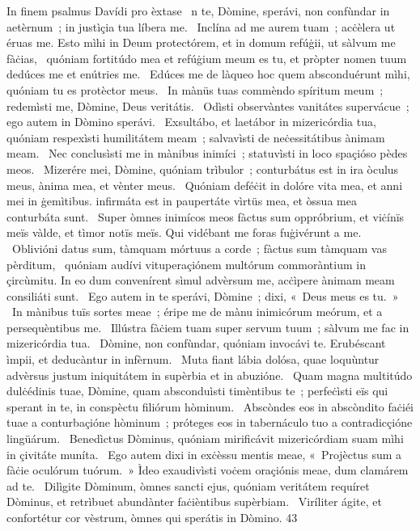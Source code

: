 { In finem psalmus Davídi pro èxtase}
{%
~n te, Dòmine, sperávi, non confùndar in aetèrnum~; in justìçia tua líbera me. 
~Inclína ad me aurem tuam~; acċèlera ut éruas me. Esto mìhi in Deum protectórem, et in domum refúġii, ut sàlvum me fàċias, 
~quóniam fortitúdo mea et refúġium meum es tu, et pròpter nomen tuum dedúces me et enútries me. 
~Edúces me de làqueo hoc quem absconduérunt mìhi, quóniam tu es protèctor meus. 
~In mànüs tuas commèndo spíritum meum~; redemìsti me, Dòmine, Deus veritátis. 
~Odìsti observàntes vanitátes supervácue~; ego autem in Dòmino sperávi. 
~Exsultábo, et laetábor in mizericórdia tua, quóniam respexìsti humilitátem meam~; salvavìsti de neċessitátibus ànimam meam. 
~Nec conclusìsti me in mànibus inimíci~; statuvìsti in loco spaçióso pèdes meos. 
~Mizerére mei, Dòmine, quóniam trìbulor~; conturbátus est in ira òculus meus, ànima mea, et vènter meus. 
~Quóniam deféċit in dolóre vita mea, et anni mei in ġemìtibus. infirmáta est in paupertáte vìrtüs mea, et òssua mea conturbáta sunt. 
~Super òmnes inimícos meos fàctus sum oppróbrium, et viċínïs meïs vàlde, et tìmor notïs meïs. Qui vidébant me foras fuġivérunt a me. 
~Oblivióni datus sum, tàmquam mórtuus a corde~; fàctus sum tàmquam vas pèrditum, 
~quóniam audívi vituperaçiónem multórum commoràntium in çircùmitu. In eo dum convenírent sìmul advèrsum me, acċìpere ànimam meam consiliáti sunt. 
~Ego autem in te sperávi, Dòmine~; dixi, «~Deus meus es tu.~»
~In mànibus tuïs sortes meae~; éripe me de mànu inimicórum meórum, et a persequèntibus me. 
~Illústra fàċiem tuam super servum tuum~; sàlvum me fac in mizericórdia tua. 
~Dòmine, non confùndar, quóniam invocávi te. Erubéscant ìmpii, et deducàntur in infèrnum. 
~Muta fiant lábia dolósa, quae loquùntur advèrsus justum iniquitátem in supèrbia et in abuzióne. 
~Quam magna multitúdo dulċédinis tuae, Dòmine, quam absconduìsti timèntibus te~; perfeċìsti eïs qui sperant in te, in conspèctu filiórum hòminum. 
~Abscòndes eos in abscòndito faċiéi tuae a conturbaçióne hòminum~; próteges eos in tabernáculo tuo a contradicçióne lingüárum. 
~Benedìctus Dòminus, quóniam mirificávit mizericórdiam suam mìhi in çivitáte muníta. 
~Ego autem dixi in exċèssu mentis meae, «~Projèctus sum a fàċie oculórum tuórum.~» Ìdeo exaudivìsti voċem oraçiónis meae, dum clamárem ad te. 
~Dilìgite Dòminum, òmnes sancti ejus, quóniam veritátem requíret Dòminus, et retrìbuet abundànter faċièntibus supèrbiam. 
~Viríliter ágite, et confortétur cor vèstrum, òmnes qui sperátis in Dòmino. 
}
{4}{3}
